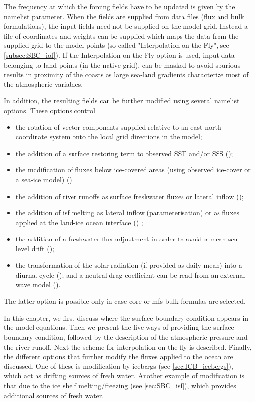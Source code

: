\documentclass[../tex_main/NEMO_manual]{subfiles}
\begin{document}
The frequency at which the forcing fields have to be updated is given by the  namelist parameter.
When the fields are supplied from data files (flux and bulk formulations),
the input fields need not be supplied on the model grid.
Instead a file of coordinates and weights can be supplied which maps the data from the supplied grid to
the model points (so called "Interpolation on the Fly", see \autoref{subsec:SBC_iof}).
If the Interpolation on the Fly option is used, input data belonging to land points (in the native grid),
can be masked to avoid spurious results in proximity of the coasts as
large sea-land gradients characterize most of the atmospheric variables.

In addition, the resulting fields can be further modified using several namelist options.
These options control 
\begin{itemize}
\item
  the rotation of vector components supplied relative to an east-north coordinate system onto
  the local grid directions in the model;
\item
  the addition of a surface restoring term to observed SST and/or SSS ();
\item
  the modification of fluxes below ice-covered areas (using observed ice-cover or a sea-ice model)
  ();
\item
  the addition of river runoffs as surface freshwater fluxes or lateral inflow ();
\item
  the addition of isf melting as lateral inflow (parameterisation) or
  as fluxes applied at the land-ice ocean interface () ; 
\item
  the addition of a freshwater flux adjustment in order to avoid a mean sea-level drift
  ();
\item
  the transformation of the solar radiation (if provided as daily mean) into a diurnal cycle
  ();
  and a neutral drag coefficient can be read from an external wave model (). 
\end{itemize}
The latter option is possible only in case core or mfs bulk formulas are selected.

In this chapter, we first discuss where the surface boundary condition appears in the model equations.
Then we present the five ways of providing the surface boundary condition, 
followed by the description of the atmospheric pressure and the river runoff. 
Next the scheme for interpolation on the fly is described.
Finally, the different options that further modify the fluxes applied to the ocean are discussed.
One of these is modification by icebergs (see \autoref{sec:ICB_icebergs}),
which act as drifting sources of fresh water.
Another example of modification is that due to the ice shelf melting/freezing (see \autoref{sec:SBC_isf}), 
which provides additional sources of fresh water.
\end{document}

